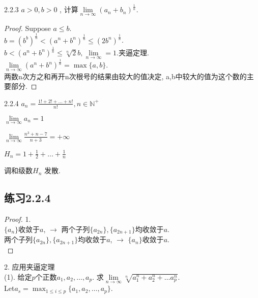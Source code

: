 \begin{example}2.2.3
	$ a>0, b>0$ , 计算$ \lim\limits_{n\rightarrow\infty}(a_n+b_n)^\frac{1}{n} $.
\end{example}
\begin{proof}
	Suppose $ a\leqslant b $.\\
	$ b = (b^b)^{\frac{1}{n}}<(a^n+b^n)^{\frac{1}{n}} \leqslant (2b^n)^{\frac{1}{n}}$.\\
	$ b<(a^n+b^n)^\frac{1}{n}\leqslant\sqrt[n]{2}b, \lim\limits_{n\rightarrow\infty} = 1 $.夹逼定理.\\
	$ \lim\limits_{n\rightarrow\infty}(a^n+b^n)^{\frac{1}{n}} = \max\{a,b\} $.\\
	两数n次方之和再开n次根号的结果由较大的值决定, a,b中较大的值为这个数的主要部分.
\end{proof}

\begin{example}2.2.4
	$ a_n  =\frac{1!+2!+\dots+n!}{n!}, n\in\mathbb{N}^+ $
\end{example}
$ \lim\limits_{n\rightarrow\infty} a_n= 1 $

\begin{example}
	$ \lim\limits_{n\rightarrow\infty}\frac{n^3+n-7}{n+3} = +\infty $
\end{example}

\begin{example}
	$ H_n = 1+\frac{1}{2}+\dots+\frac{1}{n} $
\end{example}
调和级数$ H_n $ 发散.

\subsection{练习2.2.4}

\begin{proof}1.\\
	$ \{a_n \}$收敛于$ a $, $ \rightarrow $ 两个子列$ \{a_{2n}\}, \{a_{2n+1}\} $均收敛于$ a $.\\
	两个子列$ \{a_{2n}\}, \{a_{2n+1}\} $均收敛于$ a $, $ \rightarrow $ $ \{a_n \}$收敛于$ a $.\\
\end{proof}

2.
应用夹逼定理\\
(1). 给定$ p $个正数$ a_1, a_2, \dots ,a_p $. 求$ \lim\limits_{n\rightarrow\infty}\sqrt[n]{a_1^n+a_2^n+\dots a_p^n} $.\\
Let$ a_s = \max_{1\leqslant i \leqslant p}\{a_1,a_2,\dots, a_p\} $.\\

